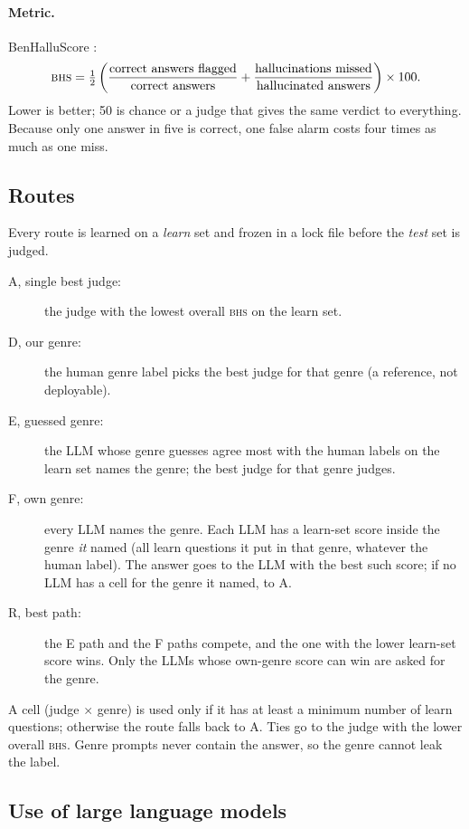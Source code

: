 \documentclass[11pt]{article}
\newcommand{\BHS}{\textsc{bhs}}
\begin{document}
\paragraph{Metric.} BenHalluScore \citep{benhallueval}:
\begin{equation}
\BHS = \tfrac{1}{2}\left(\frac{\text{correct answers flagged}}{\text{correct answers}} +
\frac{\text{hallucinations missed}}{\text{hallucinated answers}}\right)\times 100 .
\end{equation}
Lower is better; 50 is chance or a judge that gives the same verdict to everything. Because only one answer in five is
correct, one false alarm costs four times as much as one miss.

\subsection{Routes}

Every route is learned on a \emph{learn} set and frozen in a lock file before the \emph{test} set is judged.
\begin{description}
  \item[A, single best judge:] the judge with the lowest overall \BHS{} on the learn set.
  \item[D, our genre:] the human genre label picks the best judge for that genre (a reference, not deployable).
  \item[E, guessed genre:] the LLM whose genre guesses agree most with the human labels on the learn set names the
  genre; the best judge for that genre judges.
  \item[F, own genre:] every LLM names the genre. Each LLM has a learn-set score inside the genre \emph{it} named
  (all learn questions it put in that genre, whatever the human label). The answer goes to the LLM with the best such
  score; if no LLM has a cell for the genre it named, to A.
  \item[R, best path:] the E path and the F paths compete, and the one with the lower learn-set score wins. Only the
  LLMs whose own-genre score can win are asked for the genre.
\end{description}
A cell (judge $\times$ genre) is used only if it has at least a minimum number of learn questions; otherwise the
route falls back to A. Ties go to the judge with the lower overall \BHS{}. Genre prompts never contain the answer, so
the genre cannot leak the label.

\subsection{Use of large language models}\label{sec:llmuse}
\end{document}
